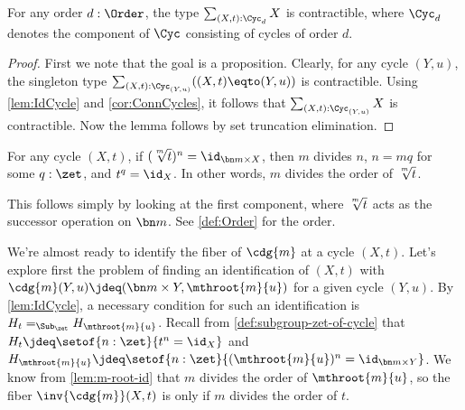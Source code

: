 \begin{lemma}\label{lem:sum-cycle-point-contr}
  For any order $d:\Order$, the type $\sum_{(X,t):\Cyc_d}X$ is contractible,
  where $\Cyc_d$ denotes the component of $\Cyc$ consisting
  of cycles of order $d$.
\end{lemma}
\begin{proof}
  First we note that the goal is a proposition.
  Clearly, for any cycle $(Y,u)$, the singleton type
  $\sum_{(X,t):\Cyc_{(Y,u)}} ((X,t)\eqto(Y,u))$ is contractible.
  Using \cref{lem:IdCycle} and \cref{cor:ConnCycles}, it follows that
  $\sum_{(X,t):\Cyc_{(Y,u)}} X$ is contractible.
  Now the lemma follows by set truncation elimination.
\end{proof}
\begin{lemma}\label{lem:m-root-id}
  For any cycle $(X,t)$, if $(\sqrt[\uproot{2}m]{t})^n = \id_{\bn m \times X}$,
  then $m$ divides $n$, \ie $n=mq$ for some $q:\zet$, and $t^q=\id_X$.
  In other words, $m$ divides the order of $\sqrt[\uproot{2}m]{t}$.
\end{lemma}
This follows simply by looking at the first component,
where $\sqrt[\uproot{2}m]{t}$ acts as the successor operation on $\bn m$.
See \cref{def:Order} for the order.

We're almost ready to identify the fiber of $\cdg{m}$ at a cycle $(X,t)$.
Let's explore first the problem of finding an identification of $(X,t)$ with 
$\cdg{m}(Y,u)\jdeq(\bn m\times Y, \mthroot{m}{u})$ for a given cycle $(Y,u)$.
By \cref{lem:IdCycle}, a necessary condition for such an identification
is $H_t =_{\Sub_\zet} H_{\mthroot{m}{u}}$. 
Recall from \cref{def:subgroup-zet-of-cycle}
that $H_t \jdeq \setof{n:\zet}{t^n=\id_X}$ and
$H_{\mthroot{m}{u}} \jdeq \setof{n:\zet}{(\mthroot{m}{u})^n=\id_{\bn m \times Y}}$.
We know from \cref{lem:m-root-id} that $m$ divides the order of
$\mthroot{m}{u}$, so the fiber $\inv{\cdg{m}}(X,t)$ is \nonempty only if 
$m$ divides the order of $t$.

